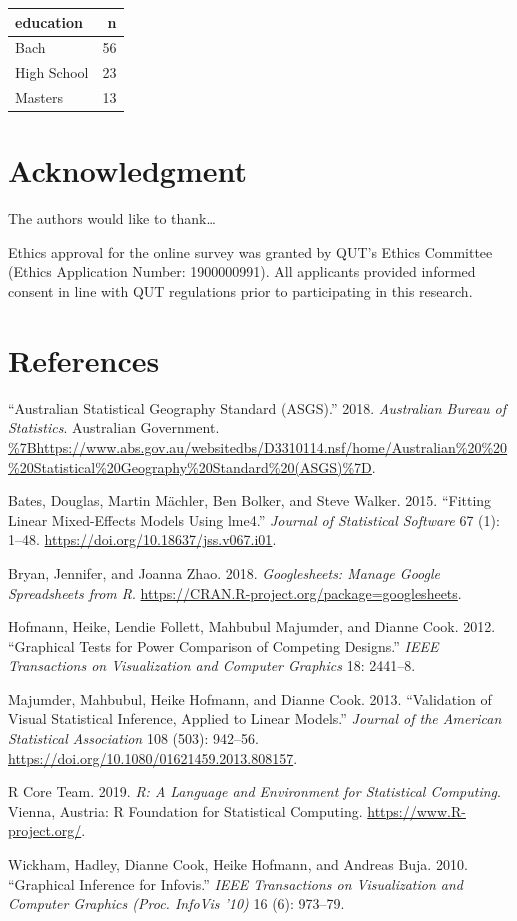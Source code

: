 \documentclass[conference,final,]{IEEEtran}
\begin{document}
\begin{tabular}{lr}
\toprule
education & n\\
\midrule
Bach & 56\\
High School & 23\\
Masters & 13\\
\bottomrule
\end{tabular}

\hypertarget{acknowledgment}{%
\section{Acknowledgment}\label{acknowledgment}}

The authors would like to thank\ldots{}

Ethics approval for the online survey was granted by QUT's Ethics
Committee (Ethics Application Number: 1900000991). All applicants
provided informed consent in line with QUT regulations prior to
participating in this research.

\newpage

\hypertarget{references}{%
\section{References}\label{references}}

\hypertarget{refs}{}
\leavevmode\hypertarget{ref-abs2016}{}%
``Australian Statistical Geography Standard (ASGS).'' 2018.
\emph{Australian Bureau of Statistics}. Australian Government.
\url{\%7Bhttps://www.abs.gov.au/websitedbs/D3310114.nsf/home/Australian\%20\%20\%20Statistical\%20Geography\%20Standard\%20(ASGS)\%7D}.

\leavevmode\hypertarget{ref-lme4}{}%
Bates, Douglas, Martin Mächler, Ben Bolker, and Steve Walker. 2015.
``Fitting Linear Mixed-Effects Models Using lme4.'' \emph{Journal of
Statistical Software} 67 (1): 1--48.
\url{https://doi.org/10.18637/jss.v067.i01}.

\leavevmode\hypertarget{ref-sheets}{}%
Bryan, Jennifer, and Joanna Zhao. 2018. \emph{Googlesheets: Manage
Google Spreadsheets from R}.
\url{https://CRAN.R-project.org/package=googlesheets}.

\leavevmode\hypertarget{ref-GTPCCD}{}%
Hofmann, Heike, Lendie Follett, Mahbubul Majumder, and Dianne Cook.
2012. ``Graphical Tests for Power Comparison of Competing Designs.''
\emph{IEEE Transactions on Visualization and Computer Graphics} 18:
2441--8.

\leavevmode\hypertarget{ref-VVSIALM}{}%
Majumder, Mahbubul, Heike Hofmann, and Dianne Cook. 2013. ``Validation
of Visual Statistical Inference, Applied to Linear Models.''
\emph{Journal of the American Statistical Association} 108 (503):
942--56. \url{https://doi.org/10.1080/01621459.2013.808157}.

\leavevmode\hypertarget{ref-RCore}{}%
R Core Team. 2019. \emph{R: A Language and Environment for Statistical
Computing}. Vienna, Austria: R Foundation for Statistical Computing.
\url{https://www.R-project.org/}.

\leavevmode\hypertarget{ref-GIIV}{}%
Wickham, Hadley, Dianne Cook, Heike Hofmann, and Andreas Buja. 2010.
``Graphical Inference for Infovis.'' \emph{IEEE Transactions on
Visualization and Computer Graphics (Proc. InfoVis '10)} 16 (6):
973--79.
\end{document}

